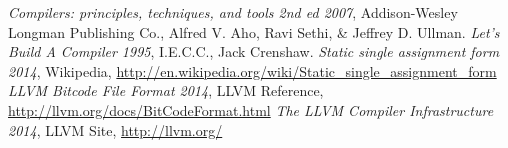 \documentclass[11pt,a4paper]{article}
\begin{document}
\begin{thebibliography}{9}

    \emph{Compilers: principles, techniques, and tools 2nd ed 2007},
    Addison-Wesley Longman Publishing Co.,
    Alfred V. Aho, Ravi Sethi, \& Jeffrey D. Ullman.
    \emph{Let's Build A Compiler 1995},
    I.E.C.C.,
    Jack Crenshaw.
    \emph{Static single assignment form 2014},
    Wikipedia,
    \url{http://en.wikipedia.org/wiki/Static_single_assignment_form}
    \emph{LLVM Bitcode File Format 2014},
    LLVM Reference,
    \url{http://llvm.org/docs/BitCodeFormat.html}
    \emph{The LLVM Compiler Infrastructure 2014},
    LLVM Site,
    \url{http://llvm.org/}
\end{thebibliography}

\clearpage
\end{document}
